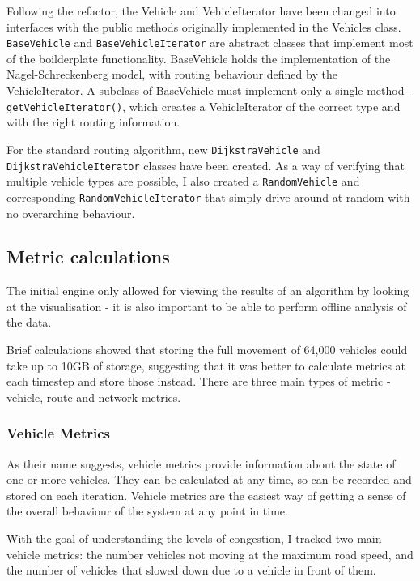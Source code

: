 \documentclass[ %
                    author={Alexander Hill},
                supervisor={Dr. Benjamin Sach},
                    degree={MEng},
                     title={MARMOSET},
                  subtitle={Multi-Agent Route Management using Online Simulation for Efficient Transportation},
                      type={research},
                      year={2016} ]{dissertation}
\begin{document}
Following the refactor, the Vehicle and VehicleIterator have been changed into
interfaces with the public methods originally implemented in the Vehicles class.
\texttt{BaseVehicle} and \texttt{BaseVehicleIterator} are abstract classes that
implement most of the boilderplate functionality. BaseVehicle holds the
implementation of the Nagel-Schreckenberg model, with routing behaviour defined
by the VehicleIterator. A subclass of BaseVehicle must implement only a single
method - \texttt{getVehicleIterator()}, which creates a VehicleIterator of the
correct type and with the right routing information.

For the standard routing algorithm, new \texttt{DijkstraVehicle} and
\texttt{DijkstraVehicleIterator} classes have been created. As a way of
verifying that multiple vehicle types are possible, I also created a
\texttt{RandomVehicle} and corresponding \texttt{RandomVehicleIterator} that
simply drive around at random with no overarching behaviour.

\subsection{Metric calculations}

The initial engine only allowed for viewing the results of an algorithm by
looking at the visualisation - it is also important to be able to perform
offline analysis of the data.

Brief calculations showed that storing the full movement of 64,000 vehicles
could take up to 10GB of storage, suggesting that it was better to calculate
metrics at each timestep and store those instead. There are three main types of
metric - vehicle, route and network metrics.

\subsubsection{Vehicle Metrics}

As their name suggests, vehicle metrics provide information about the state of
one or more vehicles. They can be calculated at any time, so can be recorded and
stored on each iteration. Vehicle metrics are the easiest way of getting a sense
of the overall behaviour of the system at any point in time.

With the goal of understanding the levels of congestion, I tracked two main
vehicle metrics: the number vehicles not moving at the maximum road speed, and
the number of vehicles that slowed down due to a vehicle in front of them.
\end{document}
